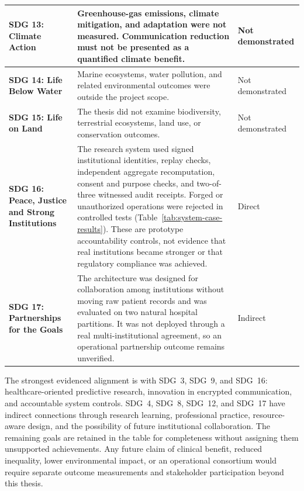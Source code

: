 \begin{longtable}{|p{3.5cm}|p{7.4cm}|p{1.8cm}|}
\textbf{SDG 13: Climate Action} &
Greenhouse-gas emissions, climate mitigation, and adaptation were not measured. Communication reduction must not be presented as a quantified climate benefit. &
Not demonstrated \\
\hline

\textbf{SDG 14: Life Below Water} &
Marine ecosystems, water pollution, and related environmental outcomes were outside the project scope. &
Not demonstrated \\
\hline

\textbf{SDG 15: Life on Land} &
The thesis did not examine biodiversity, terrestrial ecosystems, land use, or conservation outcomes. &
Not demonstrated \\
\hline

\textbf{SDG 16: Peace, Justice and Strong Institutions} &
The research system used signed institutional identities, replay checks, independent aggregate recomputation, consent and purpose checks, and two-of-three witnessed audit receipts. Forged or unauthorized operations were rejected in controlled tests (Table~\ref{tab:system-case-results}). These are prototype accountability controls, not evidence that real institutions became stronger or that regulatory compliance was achieved. &
Direct \\
\hline

\textbf{SDG 17: Partnerships for the Goals} &
The architecture was designed for collaboration among institutions without moving raw patient records and was evaluated on two natural hospital partitions. It was not deployed through a real multi-institutional agreement, so an operational partnership outcome remains unverified. &
Indirect \\
\hline
\end{longtable}

\endgroup

The strongest evidenced alignment is with SDG~3, SDG~9, and SDG~16: healthcare-oriented predictive research, innovation in encrypted communication, and accountable system controls. SDG~4, SDG~8, SDG~12, and SDG~17 have indirect connections through research learning, professional practice, resource-aware design, and the possibility of future institutional collaboration. The remaining goals are retained in the table for completeness without assigning them unsupported achievements. Any future claim of clinical benefit, reduced inequality, lower environmental impact, or an operational consortium would require separate outcome measurements and stakeholder participation beyond this thesis.
